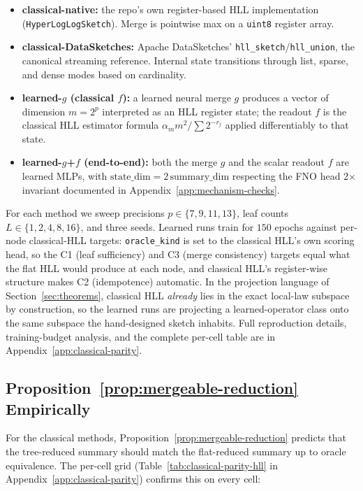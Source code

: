 \begin{itemize}[leftmargin=1.5em]
    \item \textbf{classical-native:} the repo's own register-based HLL
          implementation (\texttt{HyperLogLogSketch}). Merge is pointwise
          max on a \texttt{uint8} register array.
    \item \textbf{classical-DataSketches:} Apache DataSketches'
          \texttt{hll\_sketch}/\texttt{hll\_union}, the canonical streaming
          reference. Internal state transitions through list, sparse, and
          dense modes based on cardinality.
    \item \textbf{learned-$g$ (classical $f$):} a learned neural merge
          $g$ produces a vector of dimension $m = 2^p$ interpreted as an
          HLL register state; the readout $f$ is the classical HLL
          estimator formula $\alpha_m m^2 / \sum 2^{-r_j}$ applied
          differentiably to that state.
    \item \textbf{learned-$g$+$f$ (end-to-end):} both the merge $g$ and
          the scalar readout $f$ are learned MLPs, with
          $\text{state\_dim} = 2\,\text{summary\_dim}$ respecting the
          FNO head 2$\times$ invariant documented in
          Appendix~\ref{app:mechanism-checks}.
\end{itemize}

For each method we sweep precisions $p \in \{7, 9, 11, 13\}$, leaf counts
$L \in \{1, 2, 4, 8, 16\}$, and three seeds. Learned runs train for $150$
epochs against per-node classical-HLL targets: \texttt{oracle\_kind} is
set to the classical HLL's own scoring head, so the C1 (leaf sufficiency)
and C3 (merge consistency) targets equal what the flat HLL would produce
at each node, and classical HLL's register-wise structure makes C2
(idempotence) automatic. In the projection language of
Section~\ref{sec:theorems}, classical HLL \emph{already} lies in the
exact local-law subspace by construction, so the learned runs are
projecting a learned-operator class onto the same subspace the
hand-designed sketch inhabits. Full reproduction details,
training-budget analysis, and the complete per-cell table are in
Appendix~\ref{app:classical-parity}.

\subsection{Proposition~\ref{prop:mergeable-reduction} Empirically}

For the classical methods, Proposition~\ref{prop:mergeable-reduction}
predicts that the tree-reduced summary should match the flat-reduced
summary up to oracle equivalence. The per-cell grid
(Table~\ref{tab:classical-parity-hll} in
Appendix~\ref{app:classical-parity}) confirms this on every cell:

